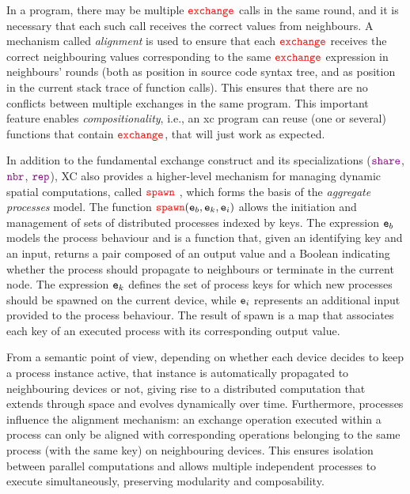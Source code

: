 \documentclass[runningheads]{llncs}
\begin{document}
In a program, there may be multiple ${\color{red}\mathtt{exchange}}$ calls in the same round, and it is necessary that each such call receives the correct values from neighbours. A mechanism called \emph{alignment} is used to ensure that each ${\color{red}\mathtt{exchange}}$ receives the correct neighbouring values corresponding to the same ${\color{red}\mathtt{exchange}}$ expression in neighbours' rounds (both as position in source code syntax tree, and as position in the current stack trace of function calls). This ensures that there are no conflicts between multiple exchanges in the same program. This important feature enables \emph{compositionality}, i.e., an \ac{xc} program can reuse (one or several) functions that contain ${\color{red}\mathtt{exchange}}$, that will just work as expected.

In addition to the fundamental exchange construct and its specializations (${{\color{violet}\mathtt{share}}}$, ${{\color{violet}\mathtt{nbr}}}$, ${{\color{violet}\mathtt{rep}}}$), XC also provides a higher-level mechanism for managing dynamic spatial computations, called ${{\color{red}\mathtt{spawn}}}$ \cite{DBLP:journals/lmcs/AudritoCDTV25,DBLP:journals/eaai/CasadeiVAPD21}, which forms the basis of the \emph{aggregate processes} model. The function ${{\color{red}\mathtt{spawn}}}(\mathtt{e}_b, \mathtt{e}_k, \mathtt{e}_i)$ allows the initiation and management of sets of distributed processes indexed by keys. The expression $\mathtt{e}_b$ models the process behaviour and is a function that, given an identifying key and an input, returns a pair composed of an output value and a Boolean indicating whether the process should propagate to neighbours or terminate in the current node. The expression $\mathtt{e}_k$ defines the set of process keys for which new processes should be spawned on the current device, while $\mathtt{e}_i$ represents an additional input provided to the process behaviour. The result of spawn is a map that associates each key of an executed process with its corresponding output value.

From a semantic point of view, depending on whether each device decides to keep a process instance active, that instance is automatically propagated to neighbouring devices or not, giving rise to a distributed computation that extends through space and evolves dynamically over time. Furthermore, processes influence the alignment mechanism: an exchange operation executed within a process can only be aligned with corresponding operations belonging to the same process (with the same key) on neighbouring devices. This ensures isolation between parallel computations and allows multiple independent processes to execute simultaneously, preserving modularity and composability.
\end{document}
